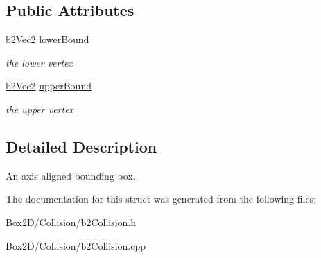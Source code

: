 \subsection*{Public Attributes}
\begin{DoxyCompactItemize}
\item 
\mbox{\label{structb2_a_a_b_b_ab94b68fbad8348b22b0522469b11bdb5}} 
\hyperlink{structb2_vec2}{b2\+Vec2} \hyperlink{structb2_a_a_b_b_ab94b68fbad8348b22b0522469b11bdb5}{lower\+Bound}
\begin{DoxyCompactList}\small\item\em the lower vertex \end{DoxyCompactList}\item 
\mbox{\label{structb2_a_a_b_b_ad4a8ec483ba13a2c02918b01d058a18f}} 
\hyperlink{structb2_vec2}{b2\+Vec2} \hyperlink{structb2_a_a_b_b_ad4a8ec483ba13a2c02918b01d058a18f}{upper\+Bound}
\begin{DoxyCompactList}\small\item\em the upper vertex \end{DoxyCompactList}\end{DoxyCompactItemize}


\subsection{Detailed Description}
An axis aligned bounding box. 

The documentation for this struct was generated from the following files\+:\begin{DoxyCompactItemize}
\item 
Box2\+D/\+Collision/\hyperlink{b2_collision_8h}{b2\+Collision.\+h}\item 
Box2\+D/\+Collision/b2\+Collision.\+cpp\end{DoxyCompactItemize}
